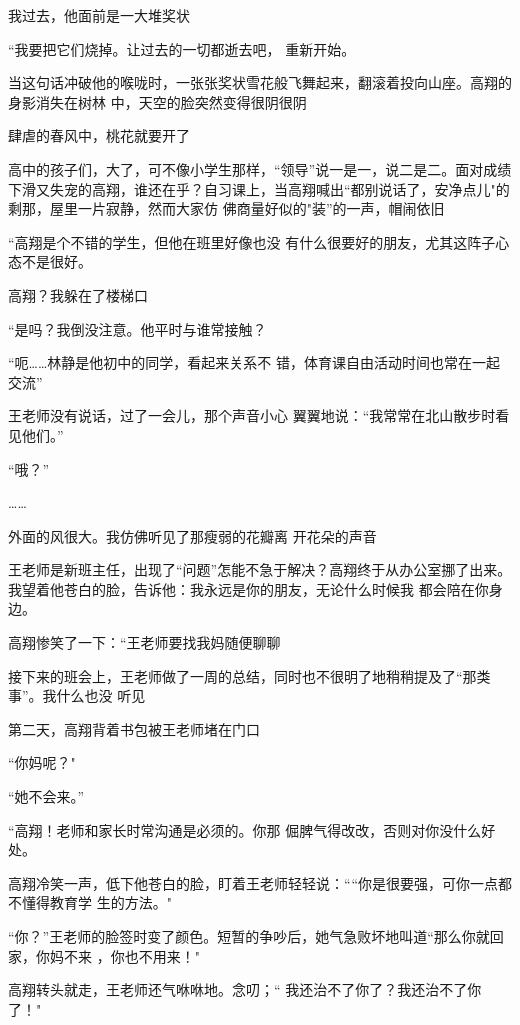 \documentclass{article}
\begin{document}
我过去，他面前是一大堆奖状 

“我要把它们烧掉。让过去的一切都逝去吧，
重新开始。 

当这句话冲破他的喉咙时，一张张奖状雪花般飞舞起来，翻滚着投向山座。高翔的身影消失在树林
中，天空的脸突然变得很阴很阴 


肆虐的春风中，桃花就要开了 

\newpage

高中的孩子们，大了，可不像小学生那样，“领导”说一是一，说二是二。面对成绩下滑又失宠的高翔，谁还在乎？自习课上，当高翔喊出“都别说话了，安净点儿"的剩那，屋里一片寂静，然而大家仿
佛商量好似的"装”的一声，帽闹依旧 

“高翔是个不错的学生，但他在班里好像也没
有什么很要好的朋友，尤其这阵子心态不是很好。 


高翔？我躲在了楼梯口 


“是吗？我倒没注意。他平时与谁常接触？ 

“呃……林静是他初中的同学，看起来关系不
错，体育课自由活动时间也常在一起交流” 

王老师没有说话，过了一会儿，那个声音小心
翼翼地说：“我常常在北山散步时看见他们。” 


“哦？” 

\newpage


…… 

外面的风很大。我仿佛听见了那瘦弱的花瓣离
开花朵的声音 

王老师是新班主任，出现了“问题”怎能不急于解决？高翔终于从办公室挪了出来。我望着他苍白的脸，告诉他：我永远是你的朋友，无论什么时候我
都会陪在你身边。 

高翔惨笑了一下：“王老师要找我妈随便聊聊

接下来的班会上，王老师做了一周的总结，同时也不很明了地稍稍提及了“那类事”。我什么也没
听见 


第二天，高翔背着书包被王老师堵在门口 


“你妈呢？" 


\newpage

“她不会来。” 

“高翔！老师和家长时常沟通是必须的。你那
倔脾气得改改，否则对你没什么好处。 

高翔冷笑一声，低下他苍白的脸，盯着王老师轻轻说：““你是很要强，可你一点都不懂得教育学
生的方法。" 

“你？”王老师的脸签时变了颜色。短暂的争吵后，她气急败坏地叫道“那么你就回家，你妈不来
，你也不用来！" 

高翔转头就走，王老师还气咻咻地。念叨；“
我还治不了你了？我还治不了你了！" 
\end{document}
